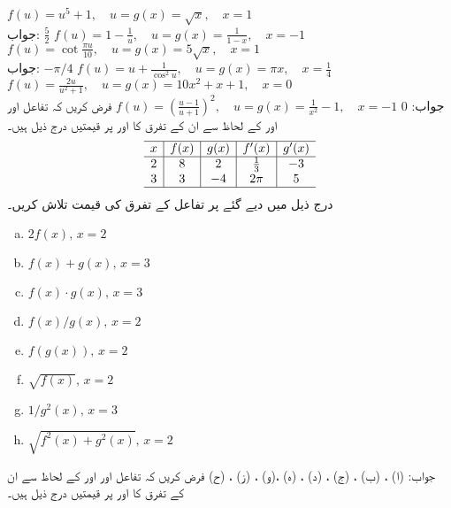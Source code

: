 $f(u)=u^5+1,\quad u=g(x)=\sqrt{x},\quad x=1$\\
جواب:\quad
$\tfrac{5}{2}$
$f(u)=1-\tfrac{1}{u},\quad u=g(x)=\tfrac{1}{1-x},\quad x=-1$
$f(u)=\cot\tfrac{\pi u}{10},\quad u=g(x)=5\sqrt{x},\quad x=1$\\
جواب:\quad
$-\pi/4$
$f(u)=u+\tfrac{1}{\cos^2u},\quad u=g(x)=\pi x,\quad x=\tfrac{1}{4}$
$f(u)=\tfrac{2u}{u^2+1},\quad u=g(x)=10x^2+x+1,\quad x=0$\\
جواب:\quad
$0$
$f(u)=(\tfrac{u-1}{u+1})^2,\quad  u=g(x)=\tfrac{1}{x^2}-1,\quad x=-1$
فرض کریں کہ تفاعل  اور  اور  کے لحاظ سے  ان کے تفرق کا  اور  پر قیمتیں درج ذیل ہیں۔
\begin{align*}
\begin{array}{c|c|c|c|c}
\hline
x&f(x)&g(x)&f'(x)&g'(x)\\
\hline
2&8&2&\tfrac{1}{3}&-3\\
3&3&-4&2\pi&5\\
\hline
\end{array}
\end{align*}
درج ذیل میں دیے گئے  پر  تفاعل کے تفرق کی قیمت تلاش کریں۔
\begin{multicols}{2}
\begin{enumerate}[a.]

\item
$2f(x),\, x=2$
\item
$f(x)+g(x),\,x=3$
\item
$f(x)\cdot g(x),\, x=3$
\item
$f(x)/g(x),\, x=2$
\item
$f(g(x)),\, x=2$
\item
$\sqrt{f(x)},\, x=2$
\item
$1/g^2(x),\, x=3$
\item
$\sqrt{f^2(x)+g^2(x)},\, x=2$
\end{enumerate}
\end{multicols}
جواب:\quad
(ا) ، (ب) ، (ج) ، (د) ، (ہ) ،(و) ، (ز) ،
 (ح) 
فرض کریں کہ تفاعل  اور  اور  کے لحاظ سے  ان کے تفرق کا  اور  پر قیمتیں درج ذیل ہیں۔
